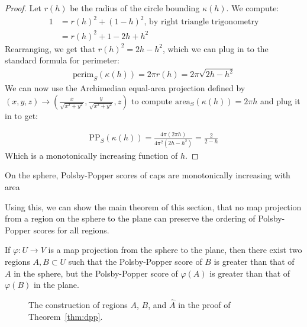 \begin{proof}
  Let $r(h)$ be the radius of the circle bounding $\kappa(h)$. We
  compute: 
  \begin{align*}
    1 &= r(h)^2 + (1-h)^2 \text {, by right triangle trigonometry}\\ 
      &= r(h)^2 + 1 - 2h+h^2
  \end{align*}
  Rearranging, we get that $r(h)^2= 2h-h^2$, which we can plug in to
  the standard formula for perimeter:
  \begin{align*}
    \mathrm{perim}_S(\kappa(h)) = 2\pi r(h) = 2\pi \sqrt{2h-h^2}
  \end{align*}
  We can now use the Archimedian equal-area projection 
  defined by $(x,y,z) \to
  \left(\frac{x}{\sqrt{x^2+y^2}},\frac{y}{\sqrt{x^2+y^2}}, z\right)$ 
  to compute $\mathrm{area}_S(\kappa(h)) = 2\pi h$ and plug it in to 
  get:

  \begin{align*}
    \mathrm{PP}_S(\kappa(h)) = \frac{4\pi (2\pi h) }{4 \pi^2 (2h-h^2)}
    = \frac{2}{2-h}
  \end{align*}
  Which is a monotonically increasing function of $h$.
\end{proof}
\begin{corollary}\label{cor:capscale}
  On the sphere, Polsby-Popper scores of caps are monotonically
  increasing with area
\end{corollary}
Using this, we can show the main theorem of this section, that no map
projection from a region on the sphere to the plane can preserve the ordering
of Polsby-Popper scores for all regions.  

\begin{theorem}\label{thm:dpp}
  If $\varphi:U\to V$ is a map projection from the sphere to the plane,
  then there exist two regions $A,B\subset U$ such that
  the Polsby-Popper score of $B$ is greater than that of $A$ in the
  sphere, but the Polsby-Popper score of $\varphi(A)$ is greater than
  that of $\varphi(B)$ in the plane.
\end{theorem}
\begin{figure}[h]\label{fig:dpp}
  \centering

  \caption{The construction of regions $A$, $B$, and $\hat{A}$ in the
  proof of Theorem~\ref{thm:dpp}.} 
\end{figure}

